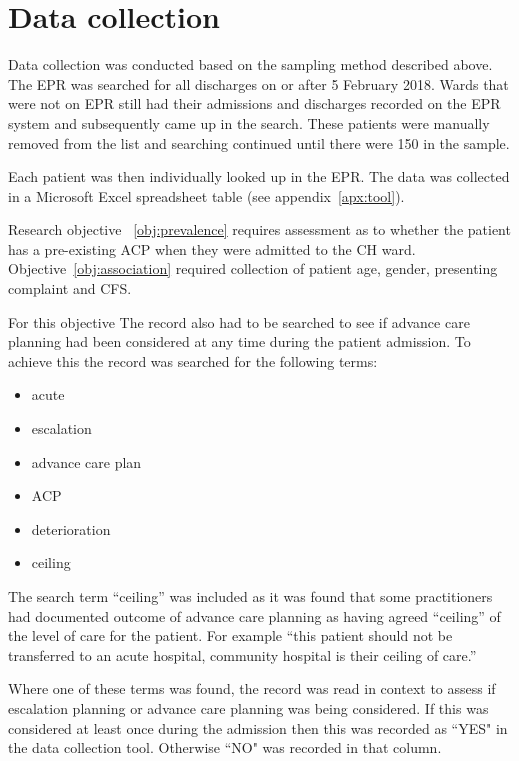\documentclass
[
	12pt,
	a4paper,
	oneside,
]{report}
\begin{document}
\section{Data collection}

Data collection was conducted based on the sampling method described above.
The EPR was searched for all discharges on or after 5 February 2018. Wards
that were not on EPR still had their admissions and discharges recorded on the
EPR system and subsequently came up in the search. These patients were 
manually removed from the list and searching continued until there were 150
in the sample.

Each patient was then individually looked up in the EPR. The data was
collected in a Microsoft Excel spreadsheet table (see appendix~\ref{apx:tool}).

Research objective~
\ref{obj:prevalence} requires assessment as to whether the patient has a
pre-existing ACP when they were admitted to the CH ward. 
Objective~\ref{obj:association} required collection of patient age, gender,
presenting complaint and CFS. 

For this objective The record also had to be searched to see if advance care
planning had been considered at any time during the patient admission. To 
achieve this the record was searched for the following terms:

\begin{itemize}
\item acute
\item escalation
\item advance care plan
\item ACP
\item deterioration
\item ceiling
\end{itemize}

The search term ``ceiling'' was included as it was found that some practitioners
had documented outcome of advance care planning as having agreed ``ceiling'' of
the level of care for the patient. For example ``this patient should not be
transferred to an acute hospital, community hospital is their ceiling of care.''

Where one of these terms was found, the record was read in context to assess if 
escalation planning or advance care planning was being considered. If this
was considered at least once during the admission then this was recorded as 
``YES"
in the data collection tool. Otherwise ``NO" was recorded in that column.
\end{document}
